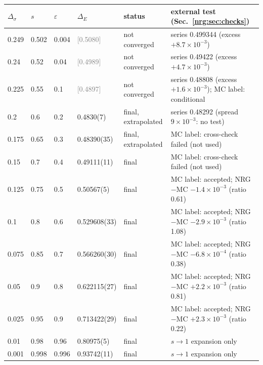 \begin{tabular}{@{}lllll>{\raggedright\arraybackslash}p{6.4cm}@{}}
\toprule
$\Delta_\sigma$ & $s$ & $\varepsilon$ & $\Delta_E$ & status & external test (Sec.~\ref{nrg:sec:checks})\\
\midrule
0.249 & 0.502 & 0.004 & \textcolor{gray}{[0.5080]} & not converged & series 0.499344 (excess $+8.7\times10^{-3}$)\\
0.24 & 0.52 & 0.04 & \textcolor{gray}{[0.4989]} & not converged & series 0.49422 (excess $+4.7\times10^{-3}$)\\
0.225 & 0.55 & 0.1 & \textcolor{gray}{[0.4897]} & not converged & series 0.48808 (excess $+1.6\times10^{-3}$); MC label: conditional\\
0.2 & 0.6 & 0.2 & 0.4830(7) & final, extrapolated & series 0.48292 (spread $9\times10^{-3}$: no test)\\
0.175 & 0.65 & 0.3 & 0.48390(35) & final, extrapolated & MC label: cross-check failed (not used)\\
0.15 & 0.7 & 0.4 & 0.49111(11) & final & MC label: cross-check failed (not used)\\
0.125 & 0.75 & 0.5 & 0.50567(5) & final & MC label: accepted; NRG$-$MC $-1.4\times10^{-3}$ (ratio 0.61)\\
0.1 & 0.8 & 0.6 & 0.529608(33) & final & MC label: accepted; NRG$-$MC $-2.9\times10^{-3}$ (ratio 1.08)\\
0.075 & 0.85 & 0.7 & 0.566260(30) & final & MC label: accepted; NRG$-$MC $-6.8\times10^{-4}$ (ratio 0.38)\\
0.05 & 0.9 & 0.8 & 0.622115(27) & final & MC label: accepted; NRG$-$MC $+2.2\times10^{-3}$ (ratio 0.81)\\
0.025 & 0.95 & 0.9 & 0.713422(29) & final & MC label: accepted; NRG$-$MC $+2.3\times10^{-3}$ (ratio 0.22)\\
0.01 & 0.98 & 0.96 & 0.80975(5) & final & $s\to1$ expansion only\\
0.001 & 0.998 & 0.996 & 0.93742(11) & final & $s\to1$ expansion only\\
\bottomrule
\end{tabular}
